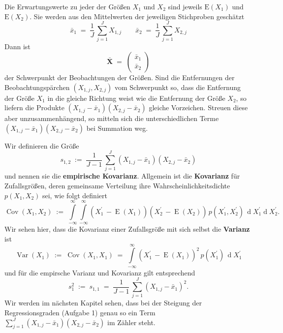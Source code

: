 Die Erwartungswerte zu jeder der Größen $X_1$ und $X_2$ sind jeweils
$\mathrm{E}(X_1)$ und $\mathrm{E}(X_2)$. Sie werden aus den Mittelwerten der jeweiligen
Stichproben geschätzt
\begin{equation}
\bar x_1 \; = \; \frac{1}{J} \, \sum_{j = 1}^J X_{1,j} \qquad
\bar x_2 \; = \; \frac{1}{J} \, \sum_{j = 1}^J X_{2,j}
\end{equation}
Dann ist
\begin{equation}
\mathbf{\bar X} \; = \;
\left(\begin{array}{c}
\bar x_1 \\
\bar x_2
\end{array}
\right)
\end{equation}
der Schwerpunkt der Beobachtungen der Größen.
Sind die Entfernungen der Beobachtungs\-pärchen $(X_{1,j}, X_{2,j})$ vom Schwerpunkt so,
dass die Entfernung der Größe $X_1$ in die gleiche Richtung weist wie die
Entfernung der Größe $X_2$, so liefern die
Produkte $(X_{1,j} - \bar x_1)(X_{2,j} - \bar x_2)$ gleiche Vorzeichen.
Streuen diese aber unzusammenhängend, so mitteln sich die unterschiedlichen Terme
$(X_{1,j} - \bar x_1)(X_{2,j} - \bar x_2)$ bei Summation weg.

Wir definieren die Größe
\begin{equation}
s_{1,2} \; := \; \frac{1}{J-1} \, \sum_{j = 1}^J (X_{1,j} - \bar x_1)(X_{2,j} - \bar x_2)
\end{equation}
und nennen sie die \textbf{empirische Kovarianz}.
Allgemein ist die \textbf{Kovarianz} für Zufallsgrößen, deren gemeinsame Verteilung
ihre Wahrscheinlichkeitsdichte $p(X_1, X_2)$ sei, wie folgt definiert
\begin{equation}
\operatorname{Cov}(X_1, X_2) \; := \;
\int\limits_{-\infty}^{\infty}\int\limits_{-\infty}^{\infty}
(X_1^\prime \, - \operatorname{E}(X_1))(X_2^\prime \, - \operatorname{E}(X_2)) \,
p(X_1^\prime, X_2^\prime) \, \operatorname{d} X_1^\prime \operatorname{d} X_2^\prime .
\end{equation}
Wir sehen hier, dass die Kovarianz einer Zufallsgröße mit sich selbst die
\textbf{Varianz} ist
\begin{equation}
\operatorname{Var}(X_1) \; := \;  \operatorname{Cov}(X_1, X_1) \; = \;
\int\limits_{-\infty}^{\infty}
(X_1^\prime \, - \operatorname{E}(X_1))^2 \,
p(X_1^\prime) \, \operatorname{d} X_1^\prime
\end{equation}
und für die empirsche Varianz und Kovarianz gilt entsprechend
\begin{equation}
s_{1}^2 \; := \; s_{1,1} \; = \;
\frac{1}{J-1} \, \sum_{j = 1}^J (X_{1,j} - \bar x_1)^2 .
\end{equation}
Wir werden im nächsten Kapitel sehen, dass bei der Steigung der Regressionsgraden
(Aufgabe 1) genau so ein Term $\sum_{j = 1}^J (X_{1,j} - \bar x_1)(X_{2,j} - \bar x_2)$
im Zähler steht.

